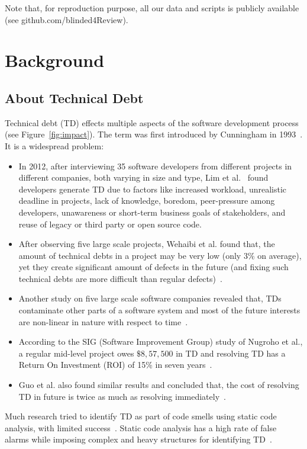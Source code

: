 \documentclass[10pt,conference]{IEEEtran}
\newcommand{\bi}{\begin{itemize}}
\newcommand{\ei}{\end{itemize}}
\newcommand{\fig}[1]{Figure~\ref{fig:#1}}
\begin{document}
 Note that, for reproduction purpose, all our data and scripts is publicly available (see  github.com/blinded4Review).


\section{Background}
\label{section: background}
\subsection{About Technical Debt}\label{sect:td101}
Technical debt (TD) effects
multiple aspects of the software development process (see \fig{impact}).
The term  was first introduced by Cunningham in 1993~\cite{cunningham1993wycash}. 
It is a widespread problem:
\bi
\item
In 2012, after interviewing 35 software developers from different projects in different companies, both varying in size and type, Lim et al.~\cite{lim2012balancing}
found  developers generate TD  due to factors like  increased workload,  unrealistic deadline in projects, lack of knowledge, boredom,
 peer-pressure among developers, unawareness or short-term business goals of stakeholders, and reuse of legacy or third party or open source code. 
\item
After observing five large scale projects, Wehaibi et al. found that, the amount of technical debts in a project may be very low (only 3\% on average), yet 
they create significant amount of defects in the future (and fixing such technical debts are more difficult than regular defects)~\cite{wehaibi2016examining}. 
\item
Another study on five large scale software companies revealed that, TDs contaminate other parts of a software system and most of the future interests are non-linear in nature with respect to time~\cite{martini2015danger}. 
\item
According to the SIG (Software Improvement Group) study of Nugroho et al., a regular mid-level project owes $\$8,57,500$ in TD and resolving TD has a Return On Investment (ROI) of 15\% in seven years~\cite{nugroho2011empirical}. 
\item
Guo et al. also found similar results and concluded that, the cost of resolving TD in future is twice as much as resolving immediately~\cite{guo2011tracking}. 
\ei
Much research tried to identify TD as part of code smells using static code analysis, with limited success~\cite{marinescu2010incode,marinescu2004detection,marinescu2012assessing,zazworka2013case,fontana2012investigating}. 
Static code analysis has a high rate of false alarms while imposing complex and heavy structures for identifying TD~\cite{tsantalis2011identification,tsantalis2015assessing,graf2010speeding,ali2012application}. 
\end{document}
